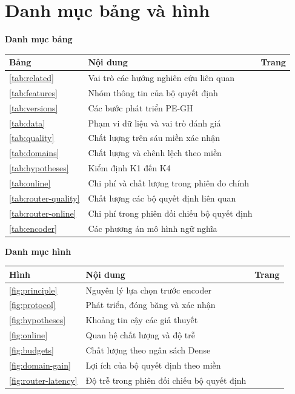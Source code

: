 \chapter*{Danh mục bảng và hình}
{\small\linespread{1.05}\selectfont
\noindent\textbf{Danh mục bảng}\par\vspace{4pt}
\noindent\begin{tabularx}{\textwidth}{@{}lYr@{}}
\hline
\textbf{Bảng} & \textbf{Nội dung} & \textbf{Trang}\\\hline
\ref{tab:related} & Vai trò các hướng nghiên cứu liên quan & \pageref{tab:related}\\
\ref{tab:features} & Nhóm thông tin của bộ quyết định & \pageref{tab:features}\\
\ref{tab:versions} & Các bước phát triển PE-GH & \pageref{tab:versions}\\
\ref{tab:data} & Phạm vi dữ liệu và vai trò đánh giá & \pageref{tab:data}\\
\ref{tab:quality} & Chất lượng trên sáu miền xác nhận & \pageref{tab:quality}\\
\ref{tab:domains} & Chất lượng và chênh lệch theo miền & \pageref{tab:domains}\\
\ref{tab:hypotheses} & Kiểm định K1 đến K4 & \pageref{tab:hypotheses}\\
\ref{tab:online} & Chi phí và chất lượng trong phiên đo chính & \pageref{tab:online}\\
\ref{tab:router-quality} & Chất lượng các bộ quyết định liên quan & \pageref{tab:router-quality}\\
\ref{tab:router-online} & Chi phí trong phiên đối chiếu bộ quyết định & \pageref{tab:router-online}\\
\ref{tab:encoder} & Các phương án mô hình ngữ nghĩa & \pageref{tab:encoder}\\\hline
\end{tabularx}
\vspace{10pt}
\par\noindent\textbf{Danh mục hình}\par\vspace{4pt}
\noindent\begin{tabularx}{\textwidth}{@{}lYr@{}}
\hline
\textbf{Hình} & \textbf{Nội dung} & \textbf{Trang}\\\hline
\ref{fig:principle} & Nguyên lý lựa chọn trước encoder & \pageref{fig:principle}\\
\ref{fig:protocol} & Phát triển, đóng băng và xác nhận & \pageref{fig:protocol}\\
\ref{fig:hypotheses} & Khoảng tin cậy các giả thuyết & \pageref{fig:hypotheses}\\
\ref{fig:online} & Quan hệ chất lượng và độ trễ & \pageref{fig:online}\\
\ref{fig:budgets} & Chất lượng theo ngân sách Dense & \pageref{fig:budgets}\\
\ref{fig:domain-gain} & Lợi ích của bộ quyết định theo miền & \pageref{fig:domain-gain}\\
\ref{fig:router-latency} & Độ trễ trong phiên đối chiếu bộ quyết định & \pageref{fig:router-latency}\\\hline
\end{tabularx}
}
